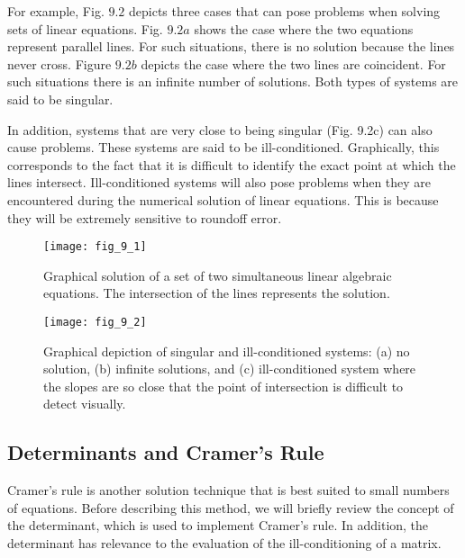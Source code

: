 \documentclass[../main.tex]{subfiles}
\begin{document}
For example, Fig. $9.2$ depicts three cases that can pose problems when solving sets of linear equations. Fig. $9.2 a$ shows the case where the two equations represent parallel lines. For such situations, there is no solution because the lines never cross. Figure $9.2 b$ depicts the case where the two lines are coincident. For such situations there is an infinite number of solutions. Both types of systems are said to be singular.

In addition, systems that are very close to being singular (Fig. 9.2c) can also cause problems. These systems are said to be ill-conditioned. Graphically, this corresponds to the fact that it is difficult to identify the exact point at which the lines intersect. Ill-conditioned systems will also pose problems when they are encountered during the numerical solution of linear equations. This is because they will be extremely sensitive to roundoff error.

\begin{figure}[H]
    \centering
    \texttt{[image: fig\_9\_1]}
    \caption{\textsf{Graphical solution of a set of two simultaneous linear algebraic equations. The intersection of the
    lines represents the solution.}}
    \label{fig:fig_9_1}
\end{figure}

\begin{figure}[H]
    \centering
    \texttt{[image: fig\_9\_2]}
    \caption{\textsf{Graphical depiction of singular and ill-conditioned systems: (a) no solution, (b) infinite solutions, and
    (c) ill-conditioned system where the slopes are so close that the point of intersection is difficult to detect visually.}}
    \label{fig:fig_9_2}
\end{figure}

\subsection{Determinants and Cramer's Rule}

Cramer's rule is another solution technique that is best suited to small numbers of equations. Before describing this method, we will briefly review the concept of the determinant, which is used to implement Cramer's rule. In addition, the determinant has relevance to the evaluation of the ill-conditioning of a matrix.
\medskip
\end{document}
